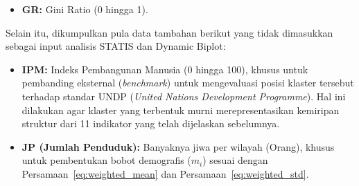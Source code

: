 \begin{enumerate}
\begin{itemize}
        \item \textbf{GR:} Gini Ratio (0 hingga 1).
    \end{itemize}
    Selain itu, dikumpulkan pula data tambahan berikut yang tidak dimasukkan sebagai input analisis STATIS dan Dynamic Biplot:
    \begin{itemize}
        \item \textbf{IPM:} Indeks Pembangunan Manusia (0 hingga 100), khusus untuk pembanding eksternal (\textit{benchmark}) untuk mengevaluasi posisi klaster tersebut terhadap standar UNDP (\textit{United Nations Development Programme}). Hal ini dilakukan agar klaster yang terbentuk murni merepresentasikan kemiripan struktur dari 11 indikator yang telah dijelaskan sebelumnya.
        \item \textbf{JP (Jumlah Penduduk):} Banyaknya jiwa per wilayah (Orang), khusus untuk pembentukan bobot demografis ($m_i$) sesuai dengan Persamaan~\ref{eq:weighted_mean} dan Persamaan~\ref{eq:weighted_std}.
    \end{itemize}
\end{enumerate}

